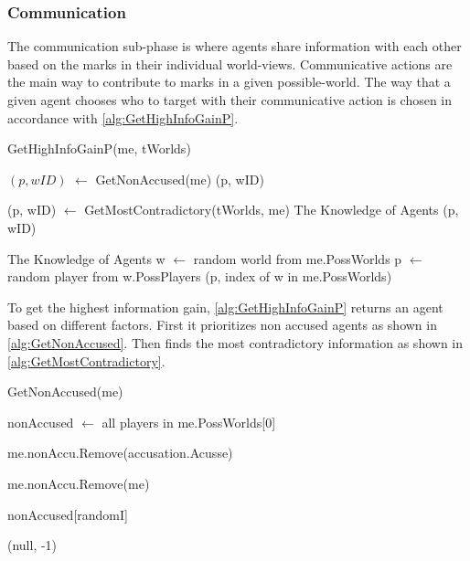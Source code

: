 \subsubsection{Communication}\label{sec:communication}
The communication sub-phase is where agents share information with each other
based on the marks in their individual world-views. Communicative actions are
the main way to contribute to marks in a given possible-world. The way that a
given agent chooses who to target with their communicative action is chosen in
accordance with \cref{alg:GetHighInfoGainP}.
\begin{algorithm}[H]
	\caption{GetHighInfoGainP(me, tWorlds)}
	\begin{algorithmic}
		\State $(p, wID)$ $\gets$ GetNonAccused(me)
		\State \Return (p, wID)
		\EndIf
		\EndIf

		\State (p, wID) $\gets$ GetMostContradictory(tWorlds, me)
		The Knowledge of Agents		\State \Return (p, wID)
		\EndIf

		The Knowledge of Agents \State w $\gets$ random world from me.PossWorlds \State
		p $\gets$ random player from w.PossPlayers \State \Return (p, index of w in
		me.PossWorlds)
	\end{algorithmic}\label{alg:GetHighInfoGainP}
\end{algorithm}
\setcounter{algorithmcaption}{2}
To get the highest information gain, \cref{alg:GetHighInfoGainP} returns an
agent based on different factors.
First it prioritizes non accused agents as shown in
\cref{alg:GetNonAccused}.
Then finds the most contradictory information as shown in
\cref{alg:GetMostContradictory}. \\
\begin{algorithm}[H]
	\caption{GetNonAccused(me)}
	\begin{algorithmic}
		\State nonAccused $\gets$ all players in me.PossWorlds[0]
		\EndIf

		\State me.nonAccu.Remove(accusation.Acusse)
		\EndFor

		\State me.nonAccu.Remove(me)

		\State \Return nonAccused[randomI]
		\EndIf

		\State \Return (null, -1)
	\end{algorithmic}\label{alg:GetNonAccused}
\end{algorithm}
